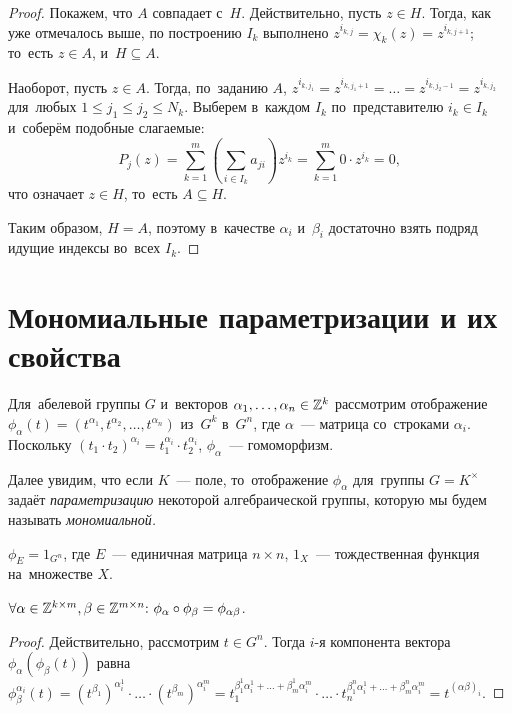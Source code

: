 \documentclass[a4paper,oneside]{article}
\begin{document}
\begin{proof}
  Покажем, что $A$ совпадает с~$H$. Действительно, пусть $z \in H$. Тогда, как уже отмечалось выше,
  по построению $I_k$ выполнено $z^{i_{k, j}} = \chi_k(z) = z^{i_{k, j + 1}}$; то~есть $z \in A$, и~$H \subseteq A$.

  Наоборот, пусть $z \in A$. Тогда, по~заданию $A$, $z^{i_{k, j_1}} = z^{i_{k, j_1 + 1}} = \ldots = z^{i_{k, j_2 - 1}} = z^{i_{k, j_2}}$
  для~любых $1 \leq j_1 \leq j_2 \leq N_k$. Выберем в~каждом $I_k$ по~представителю $i_k \in I_k$ и~соберём подобные слагаемые:
  \[
    P_j(z) = \sum_{k = 1}^{m} \left( \sum_{i \in I_k} a_{ji} \right) z^{i_k} = \sum_{k = 1}^{m} 0 \cdot z^{i_k} = 0,
  \]
  что означает $z \in H$, то~есть $A \subseteq H$.

  Таким образом, $H = A$, поэтому в~качестве $\alpha_i$ и~$\beta_i$ достаточно взять подряд идущие индексы во~всех $I_k$.
\end{proof}

\section{Мономиальные параметризации и их свойства}
Для~абелевой группы $G$ и~векторов $\alpha_1, \ldots, \alpha_n \in \mathbb{Z}^k$ рассмотрим отображение $\phi_\alpha(t) = (t^{\alpha_1}, t^{\alpha_2}, \ldots, t^{\alpha_n})$
из~$G^k$ в~$G^n$, где $\alpha$~— матрица со~строками $\alpha_i$. Поскольку $(t_1 \cdot t_2)^{\alpha_i} = t_1^{\alpha_i} \cdot t_2^{\alpha_i}$,
$\phi_\alpha$~— гомоморфизм.

Далее увидим, что если $K$~— поле, то~отображение $\phi_\alpha$ для~группы $G = K^\times$ задаёт \textit{параметризацию} некоторой алгебраической группы,
которую мы будем называть \textit{мономиальной.}

\begin{statement*}
  $\phi_{E} = 1_{G^n}$, где $E$~— единичная матрица $n \times n$, $1_X$~— тождественная функция на~множестве $X$.
\end{statement*}

\begin{statement*}
  $
    \forall \alpha \in \mathbb{Z}^{k \times m}, \beta \in \mathbb{Z}^{m \times n}{:}\ \phi_\alpha \circ \phi_\beta = \phi_{\alpha \beta}
  $.
\end{statement*}

\begin{proof}
  Действительно, рассмотрим $t \in G^n$. Тогда $i$-я компонента вектора $\phi_\alpha(\phi_\beta(t))$
  равна
  $ \phi_\beta^{\alpha_i}(t) = (t^{\beta_1})^{\alpha_i^1} \cdot \ldots \cdot (t^{\beta_m})^{\alpha_i^m}
                             = t_1^{\beta_1^1 \alpha_i^1 + \ldots + \beta_m^1 \alpha_i^m} \cdot
                               \ldots \cdot
                               t_n^{\beta_1^n \alpha_i^1 + \ldots + \beta_m^n \alpha_i^m}
                             = t^{(\alpha \beta)_i}.
  $
\end{proof}
\end{document}
